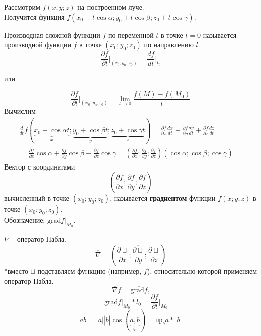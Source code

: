 \documentclass[12pt]{article}
\begin{document}
    Рассмотрим $f(x;y;z)$ на построенном луче.\\
    Получится функция $f(x_0 + t\cos \alpha; y_0 + t \cos \beta; z_0 + t \cos \gamma)$.\par\noindent
    Производная сложной функции $f$ по переменной $t$ в точке $t = 0$ называется производной функции $f$ в точке $(x_0; y_0; z_0)$ по направлению $l$.
    \[ \frac{\partial f}{\partial l} \Big|_{(x_0; y_0; z_0)} = \frac{df}{dt}\Big|_{t_0} \]
    \begin{center}
        или
        \end{center}
    \[ \frac{\partial f}{\partial l} \Big|_{(x_0; y_0; z_0)} = \lim_{t \to 0}\frac{f(M) - f(M_0)}{t} \]
    Вычислим
    \begin{gather*}
        \frac{d}{dt}f(\underbrace{x_0 + \cos \alpha t}_x; \underbrace{y_0 + \cos \beta t}_y; \underbrace{z_0 + \cos \gamma t}_z) = \frac{\partial f}{\partial x} \frac{dx}{dt} + \frac{\partial f}{\partial y} \frac{dy}{dt} + \frac{\partial f}{\partial z} \frac{dz}{dt} =\\
        = \frac{\partial f}{\partial x} \cos \alpha + \frac{\partial f}{\partial y} \cos \beta + \frac{\partial f}{\partial z} \cos \gamma = \left( \overline{\frac{\partial f}{\partial x}; \frac{\partial f}{\partial y}; \frac{\partial f}{\partial z}} \right)\left( \overline{\cos \alpha; \cos \beta; \cos \gamma} \right) \boxed{=}
    \end{gather*}
    Вектор с координатами 
    \[ \left( \overline{\frac{\partial f}{\partial x}; \frac{\partial f}{\partial y}; \frac{\partial f}{\partial z}} \right) \]
    вычисленный в точке $(x_0; y_0; z_0)$, называется \textbf{градиентом} функции $f(x; y; z)$ в точке $(x_0; y_0; z_0)$.\\
    Обозначение: $\overline{\text{grad}f} \Big|_{M_0}$.\par\noindent
    $\overline{\nabla}$ - оператор Набла.
    \[ \overline{\nabla} = \left( \overline{ \frac{\partial \sqcup}{\partial x}; \frac{\partial \sqcup}{\partial y}; \frac{\partial \sqcup}{\partial z} } \right) \]
    *вместо $\sqcup$ подставляем функцию (например, $f$), относительно которой применяем оператор Набла.
    \[ \overline{\nabla} f = \overline{\text{grad}f}\text{,} \]
    \[ \boxed{=} \, \boxed{ \overline{\text{grad}f}\Big|_{M_0} * \overline{l_0} = \frac{\partial f}{\partial l}\Big|_{M_0} } \]
    \[ \overline{a}\overline{b} = |\overline{a}||\overline{b}|\cos(\underbrace{\overline{a}, \overline{b}}_{\varphi}) = \text{пр}_{\overline{b}} \overline{a} * |\overline{b}| \]
\end{document}
